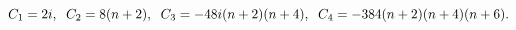 \begin{equation}
C_{1}=2i, \hspace{0.2cm}
C_{2}=8(n+2), \hspace{0.2cm}
C_{3}=-48i(n+2)(n+4), \hspace{0.2cm}C_{4}=-384(n+2)(n+4)(n+6).
\label{valueofC}
\end{equation}

